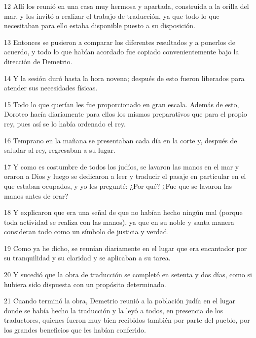 \par 12 Allí los reunió en una casa muy hermosa y apartada, construida a la orilla del mar, y los invitó a realizar el trabajo de traducción, ya que todo lo que necesitaban para ello estaba disponible puesto a su disposición.

\par 13 Entonces se pusieron a comparar los diferentes resultados y a ponerlos de acuerdo, y todo lo que habían acordado fue copiado convenientemente bajo la dirección de Demetrio.

\par 14 Y la sesión duró hasta la hora novena; después de esto fueron liberados para atender sus necesidades físicas.

\par 15 Todo lo que querían les fue proporcionado en gran escala. Además de esto, Doroteo hacía diariamente para ellos los mismos preparativos que para el propio rey, pues así se lo había ordenado el rey.

\par 16 Temprano en la mañana se presentaban cada día en la corte y, después de saludar al rey, regresaban a su lugar.

\par 17 Y como es costumbre de todos los judíos, se lavaron las manos en el mar y oraron a Dios y luego se dedicaron a leer y traducir el pasaje en particular en el que estaban ocupados, y yo les pregunté: ¿Por qué? ¿Fue que se lavaron las manos antes de orar?

\par 18 Y explicaron que era una señal de que no habían hecho ningún mal (porque toda actividad se realiza con las manos), ya que en su noble y santa manera consideran todo como un símbolo de justicia y verdad.

\par 19 Como ya he dicho, se reunían diariamente en el lugar que era encantador por su tranquilidad y su claridad y se aplicaban a su tarea.

\par 20 Y sucedió que la obra de traducción se completó en setenta y dos días, como si hubiera sido dispuesta con un propósito determinado.

\par 21 Cuando terminó la obra, Demetrio reunió a la población judía en el lugar donde se había hecho la traducción y la leyó a todos, en presencia de los traductores, quienes fueron muy bien recibidos también por parte del pueblo, por los grandes beneficios que les habían conferido.

